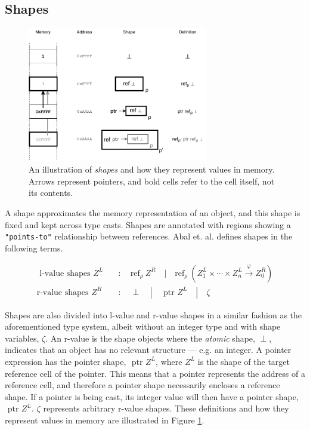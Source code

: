 \subsection{Shapes}
\begin{figure}[H]
    \centering
    \includegraphics[width=0.7\textwidth]{background/figures/shapes}
    \caption{An illustration of \textit{shapes} and how they represent values in memory. Arrows represent pointers, and bold cells refer to the cell itself, not its contents.}
    \label{shapes-figure}
\end{figure}

\newpar A shape approximates the memory representation of an object, and this shape is fixed and kept across type casts. Shapes are annotated with regions showing a \texttt{"points-to"} relationship between references. Abal et. al. defines shapes in the following terms. 

\begin{equation*}
\begin{aligned}
    \text { l-value shapes } Z^L \quad &: \quad \text{ref}_{\rho} \:Z^R \quad | \quad \text{ref}_{\rho}\:(Z_1^L \times \cdots \times Z_n^L \stackrel{\varphi}{\rightarrow} Z_0^R)\\
    \text {r-value shapes } Z^R \quad &: \quad \perp \quad | \quad \text { ptr } Z^L \quad | \quad \zeta
\end{aligned}
\end{equation*} 

\noindent Shapes are also divided into l-value and r-value shapes in a similar fashion as the aforementioned type system, albeit without an integer type and with shape variables, $\zeta$. An r-value is the shape objects where the \textit{atomic} shape, $\perp$, indicates that an object has no relevant structure --- e.g. an integer. A pointer expression has the pointer shape, $\text{ ptr } Z^L$, where $Z^L$ is the shape of the target reference cell of the pointer. This means that a pointer represents the address of a reference cell, and therefore a pointer shape necessarily encloses a reference shape. If a pointer is being cast, its integer value will then have a pointer shape, $\text{ ptr } Z^L$. $\zeta$ represents arbitrary r-value shapes. These definitions and how they represent values in memory are illustrated in Figure \ref{shapes-figure}.

